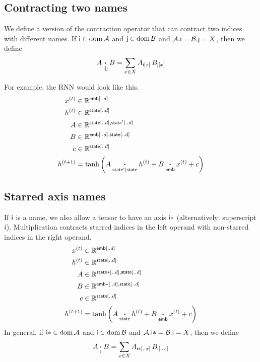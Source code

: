 \documentclass{article}
\newcommand{\nndot}[2]{\mathbin{\mathop{\boldsymbol\cdot}\limits_{\name{#1}|\name{#2}}}}
\DeclareMathOperator{\tupledom}{dom}
\newcommand{\tupleproj}[2]{#1.\name{#2}}
\begin{document}
\subsection{Contracting two names}

We define a version of the contraction operator that can contract two indices with different names. If $\name{i} \in \tupledom \mathcal{A}$ and $\name{j} \in \tupledom \mathcal{B}$ and $\tupleproj{\mathcal{A}}{i} = \tupleproj{\mathcal{B}}{j} = X$, then we define
\begin{equation*}
A \nndot{i}{j} B = \sum_{x \in X} A_{\nidx{i}{x}} \, B_{\nidx{j}{x}}
\end{equation*}

For example, the RNN would look like this.
\begin{align*}
x^{(t)} &\in \mathbb{R}^{\nset{emb}{..d}} \\
h^{(t)} &\in \mathbb{R}^{\nset{state}{..d}} \\
A &\in \mathbb{R}^{\nset{state}{..d}, \nset{state'}{..d}} \\
B &\in \mathbb{R}^{\nset{emb}{..d}, \nset{state}{..d}} \\
c &\in \mathbb{R}^{\nset{state}{..d}} \\
h^{(t+1)} &= \tanh\left( A \nndot{state'}{state} h^{(t)} + B \ndot{emb} x^{(t)} + c \right)
\end{align*}

\subsection{Starred axis names}

If $\mathsf{i}$ is a name, we also allow a tensor to have an axis $\mathsf{i*}$ (alternatively: superscript $\mathsf{i}$). Multiplication contracts starred indices in the left operand with non-starred indices in the right operand.
\begin{align*}
x^{(t)} &\in \mathbb{R}^{\mathsf{emb}[..d]} \\
h^{(t)} &\in \mathbb{R}^{\mathsf{state}[..d]} \\
A &\in \mathbb{R}^{\mathsf{state*}[..d], \mathsf{state}[..d]} \\
B &\in \mathbb{R}^{\mathsf{emb*}[..d], \mathsf{state}[..d]} \\
c &\in \mathbb{R}^{\mathsf{state}[..d]} \\
h^{(t+1)} &= \tanh\left( A \mathbin{\mathop{\boldsymbol\cdot}\limits_{\mathsf{state}}} h^{(t)} + B \mathbin{\mathop{\boldsymbol\cdot}\limits_{\mathsf{emb}}} x^{(t)} + c \right) 
\end{align*}
In general, if $\name{i*} \in \tupledom \mathcal{A}$ and $\name{i} \in \tupledom \mathcal{B}$ and $\tupleproj{\mathcal{A}}{i*} = \tupleproj{\mathcal{B}}{i} = X$, then we define
\begin{equation*}
A \mathbin{\mathop{\boldsymbol\cdot}\limits_{\mathsf{i}}} B = \sum_{x \in X} A_{\mathsf{i*}[..x]} \, B_{\mathsf{i}[..x]}
\end{equation*}
\end{document}
